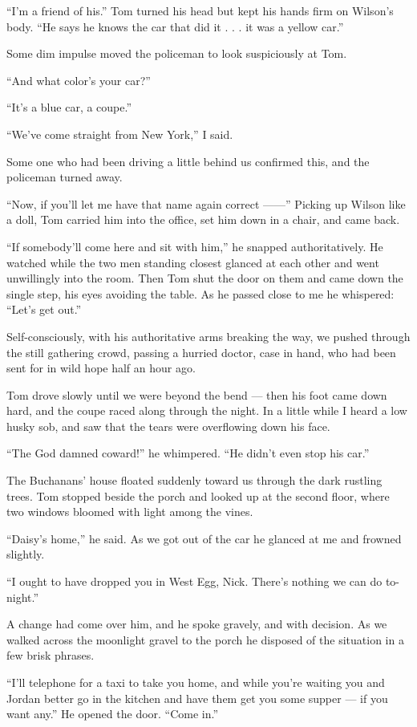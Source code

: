\documentclass{znotebook}
\begin{document}
``I'm a friend of his.'' Tom turned his head but kept his hands firm on Wilson's body. ``He says he knows the car that did it . . . it was a yellow car.''

Some dim impulse moved the policeman to look suspiciously at Tom.

``And what color's your car?''

``It's a blue car, a coupe.''

``We've come straight from New York,'' I said.

Some one who had been driving a little behind us confirmed this, and the policeman turned away.

``Now, if you'll let me have that name again correct ——'' Picking up Wilson like a doll, Tom carried him into the office, set him down in a chair, and came back.

``If somebody'll come here and sit with him,'' he snapped authoritatively. He watched while the two men standing closest glanced at each other and went unwillingly into the room. Then Tom shut the door on them and came down the single step, his eyes avoiding the table. As he passed close to me he whispered: ``Let's get out.''

Self-consciously, with his authoritative arms breaking the way, we pushed through the still gathering crowd, passing a hurried doctor, case in hand, who had been sent for in wild hope half an hour ago.

Tom drove slowly until we were beyond the bend — then his foot came down hard, and the coupe raced along through the night. In a little while I heard a low husky sob, and saw that the tears were overflowing down his face.

``The God damned coward!'' he whimpered. ``He didn't even stop his car.''

The Buchanans' house floated suddenly toward us through the dark rustling trees. Tom stopped beside the porch and looked up at the second floor, where two windows bloomed with light among the vines.

``Daisy's home,'' he said. As we got out of the car he glanced at me and frowned slightly.

``I ought to have dropped you in West Egg, Nick. There's nothing we can do to-night.''

A change had come over him, and he spoke gravely, and with decision. As we walked across the moonlight gravel to the porch he disposed of the situation in a few brisk phrases.

``I'll telephone for a taxi to take you home, and while you're waiting you and Jordan better go in the kitchen and have them get you some supper — if you want any.'' He opened the door. ``Come in.''
\end{document}
